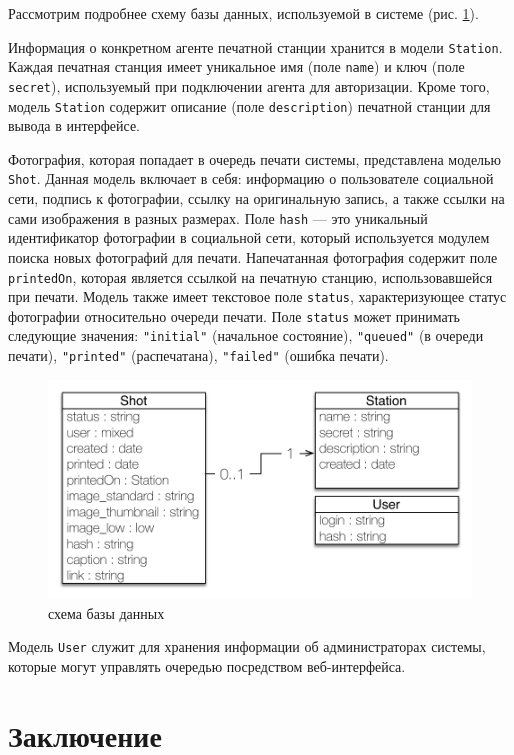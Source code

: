 \documentclass[a4paper,14pt,href]{article}
\begin{document}
Рассмотрим подробнее схему базы данных, используемой в системе (рис. \ref{fig:DataModel}).

Информация о конкретном агенте печатной станции хранится в модели \texttt{Station}. Каждая печатная станция имеет
уникальное имя (поле \texttt{name}) и ключ (поле \texttt{secret}), используемый при подключении агента для авторизации.
Кроме того, модель \texttt{Station} содержит описание (поле \texttt{description}) печатной станции для вывода в интерфейсе.

Фотография, которая попадает в очередь печати системы, представлена моделью \texttt{Shot}. Данная модель включает в себя:
информацию о пользователе социальной сети, подпись к фотографии, ссылку на оригинальную запись, а также ссылки на сами
изображения в разных размерах. Поле \texttt{hash} --- это уникальный идентификатор фотографии в социальной сети, который
используется модулем поиска новых фотографий для печати. Напечатанная фотография содержит поле \texttt{printedOn}, которая
является ссылкой на печатную станцию, использовавшейся при печати. Модель также имеет текстовое поле \texttt{status},
характеризующее статус фотографии относительно очереди печати. Поле \texttt{status} может принимать следующие значения:
\texttt{"initial"} (начальное состояние), \texttt{"queued"} (в очереди печати), \texttt{"printed"} (распечатана), \texttt{"failed"}
(ошибка печати).

\begin{figure}[htbp]
\begin{center}
  \includegraphics[scale=0.8]{data-model-uml.pdf}
    \caption{схема базы данных}
    \label{fig:DataModel}
\end{center}
\end{figure}

Модель \texttt{User} служит для хранения информации об администраторах системы, которые могут управлять очередью посредством
веб-интерфейса.


\newpage
\section*{Заключение}


\newpage
{}



\end{document}

